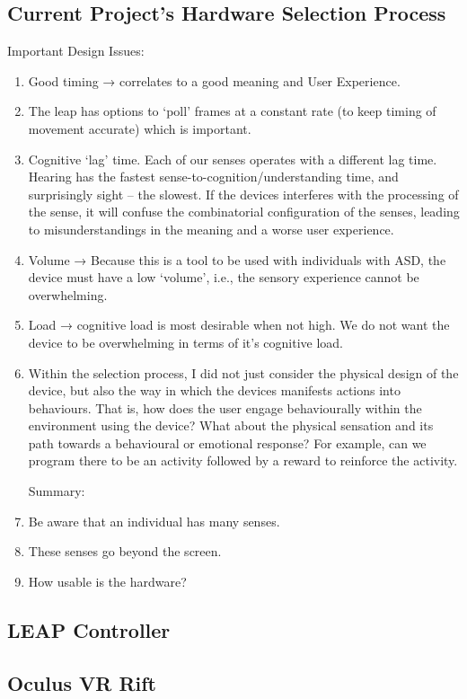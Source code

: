 \documentclass[10pt]{article}
\begin{document}
\subsection{Current Project’s Hardware Selection Process}
Important Design Issues:
\begin{enumerate}
\item Good timing → correlates to a good meaning and User Experience.
\item The leap has options to ‘poll’ frames at a constant rate (to keep timing of movement accurate) which is important.
\item Cognitive ‘lag’ time. Each of our senses operates with a different lag time. Hearing has the fastest sense-to-cognition/understanding time, and surprisingly sight -- the slowest. If the devices interferes with the processing of the sense, it will confuse the combinatorial configuration of the senses, leading to misunderstandings in the meaning and a worse user experience.
\item Volume → Because this is a tool to be used with individuals with ASD, the device must have a low ‘volume’, i.e., the sensory experience cannot be overwhelming.
\item Load → cognitive load is most desirable when not high. We do not want the device to be overwhelming in terms of it’s cognitive load.
\item Within the selection process, I did not just consider the physical design of the device, but also the way in which the devices manifests actions into behaviours. That is, how does the user engage behaviourally within the environment using the device? What about the physical sensation and its path towards a behavioural or emotional response? For example, can we program there to be an activity followed by a reward to reinforce the activity.

Summary:
\item Be aware that an individual has many senses.
\item These senses go beyond the screen.
\item How usable is the hardware?

\end{enumerate}

\subsection{LEAP Controller}
\subsection{Oculus VR Rift}
\end{document}
